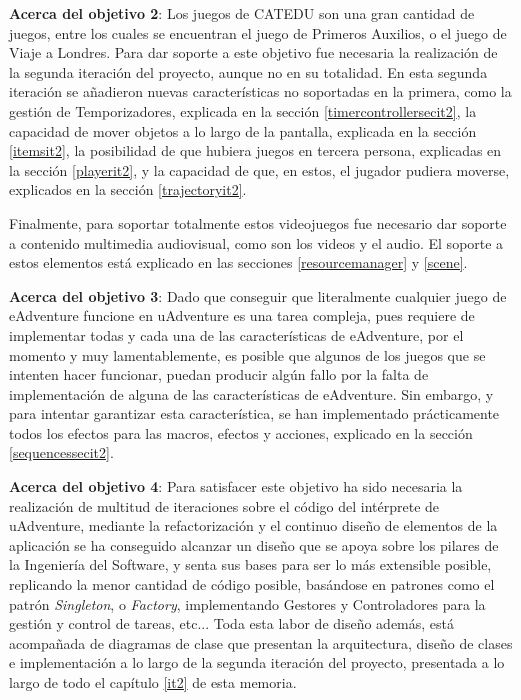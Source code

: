 \textbf{Acerca del objetivo 2}: Los juegos de CATEDU son una gran cantidad de juegos, entre los cuales se encuentran el juego de Primeros Auxilios, o el juego de Viaje a Londres. Para dar soporte a este objetivo fue necesaria la realización de la segunda iteración del proyecto, aunque no en su totalidad. En esta segunda iteración se añadieron nuevas características no soportadas en la primera, como la gestión de Temporizadores, explicada en la sección \ref{timercontrollersecit2}, la capacidad de mover objetos a lo largo de la pantalla, explicada en la sección \ref{itemsit2}, la posibilidad de que hubiera juegos en tercera persona, explicadas en la sección \ref{playerit2}, y la capacidad de que, en estos, el jugador pudiera moverse, explicados en la sección \ref{trajectoryit2}.

Finalmente, para soportar totalmente estos videojuegos fue necesario dar soporte a contenido multimedia audiovisual, como son los videos y el audio. El soporte a estos elementos está explicado en las secciones \ref{resourcemanager} y \ref{scene}.

\textbf{Acerca del objetivo 3}: Dado que conseguir que literalmente cualquier juego de eAdventure funcione en uAdventure es una tarea compleja, pues requiere de implementar todas y cada una de las características de eAdventure, por el momento y muy lamentablemente, es posible que algunos de los juegos que se intenten hacer funcionar, puedan producir algún fallo por la falta de implementación de alguna de las características de eAdventure. Sin embargo, y para intentar garantizar esta característica, se han implementado prácticamente todos los efectos para las macros, efectos y acciones, explicado en la sección \ref{sequencessecit2}.

\textbf{Acerca del objetivo 4}: Para satisfacer este objetivo ha sido necesaria la realización de multitud de iteraciones sobre el código del intérprete de uAdventure, mediante la refactorización y el continuo diseño de elementos de la aplicación se ha conseguido alcanzar un diseño que se apoya sobre los pilares de la Ingeniería del Software, y senta sus bases para ser lo más extensible posible, replicando la menor cantidad de código posible, basándose en patrones como el patrón \textit{Singleton}, o \textit{Factory}, implementando Gestores y Controladores para la gestión y control de tareas, etc... Toda esta labor de diseño además, está acompañada de diagramas de clase que presentan la arquitectura, diseño de clases e implementación a lo largo de la segunda iteración del proyecto, presentada a lo largo de todo el capítulo \ref{it2} de esta memoria.

